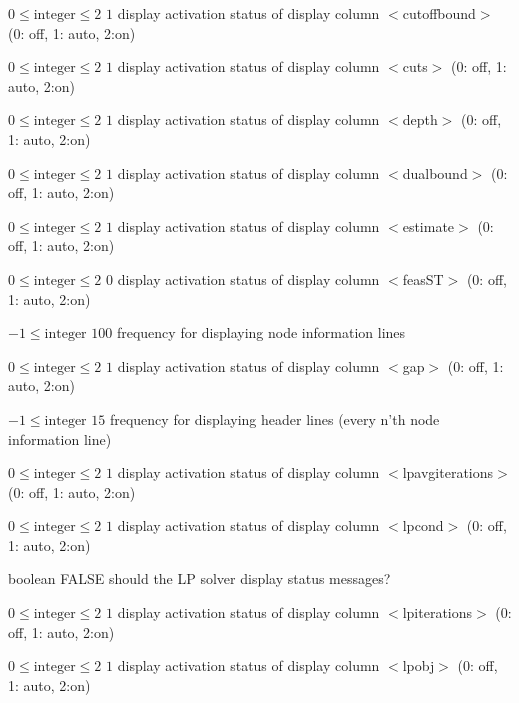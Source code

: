 %
{$0\leq\textrm{integer}\leq2$}%
{$1$}%
{display activation status of display column $<$cutoffbound$>$ (0: off, 1: auto, 2:on)}%
{}

%
{$0\leq\textrm{integer}\leq2$}%
{$1$}%
{display activation status of display column $<$cuts$>$ (0: off, 1: auto, 2:on)}%
{}

%
{$0\leq\textrm{integer}\leq2$}%
{$1$}%
{display activation status of display column $<$depth$>$ (0: off, 1: auto, 2:on)}%
{}

%
{$0\leq\textrm{integer}\leq2$}%
{$1$}%
{display activation status of display column $<$dualbound$>$ (0: off, 1: auto, 2:on)}%
{}

%
{$0\leq\textrm{integer}\leq2$}%
{$1$}%
{display activation status of display column $<$estimate$>$ (0: off, 1: auto, 2:on)}%
{}

%
{$0\leq\textrm{integer}\leq2$}%
{$0$}%
{display activation status of display column $<$feasST$>$ (0: off, 1: auto, 2:on)}%
{}

%
{$-1\leq\textrm{integer}$}%
{$100$}%
{frequency for displaying node information lines}%
{}

%
{$0\leq\textrm{integer}\leq2$}%
{$1$}%
{display activation status of display column $<$gap$>$ (0: off, 1: auto, 2:on)}%
{}

%
{$-1\leq\textrm{integer}$}%
{$15$}%
{frequency for displaying header lines (every n'th node information line)}%
{}

%
{$0\leq\textrm{integer}\leq2$}%
{$1$}%
{display activation status of display column $<$lpavgiterations$>$ (0: off, 1: auto, 2:on)}%
{}

%
{$0\leq\textrm{integer}\leq2$}%
{$1$}%
{display activation status of display column $<$lpcond$>$ (0: off, 1: auto, 2:on)}%
{}

%
{boolean}%
{FALSE}%
{should the LP solver display status messages?}%
{}

%
{$0\leq\textrm{integer}\leq2$}%
{$1$}%
{display activation status of display column $<$lpiterations$>$ (0: off, 1: auto, 2:on)}%
{}

%
{$0\leq\textrm{integer}\leq2$}%
{$1$}%
{display activation status of display column $<$lpobj$>$ (0: off, 1: auto, 2:on)}%
{}

